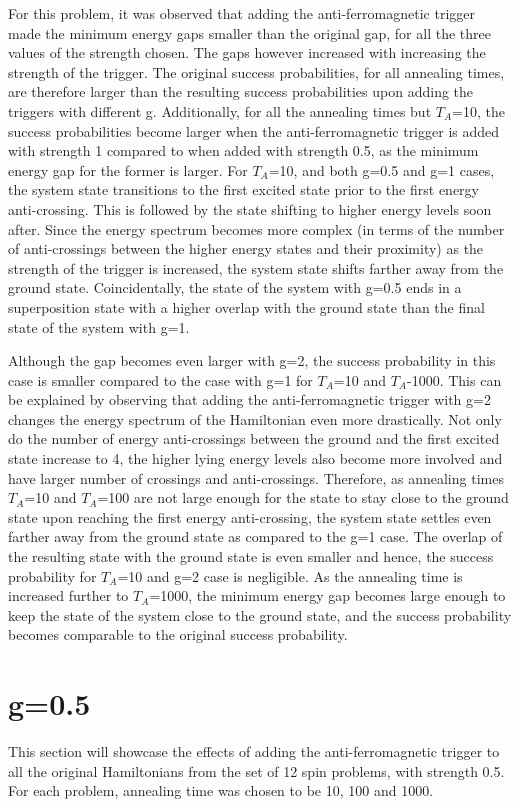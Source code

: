 \documentclass[../main.tex]{subfiles}
\begin{document}
For this problem, it was observed that adding the anti-ferromagnetic trigger made the minimum energy gaps smaller than the original gap, for all the three values of the strength chosen. The gaps however increased with increasing the strength of the trigger. The original success probabilities, for all annealing times, are therefore larger than the resulting success probabilities upon adding the triggers with different g. Additionally, for all the annealing times but $T_A$=10, the success probabilities become larger when the anti-ferromagnetic trigger is added with strength 1 compared to when added with strength 0.5, as the minimum energy gap for the former is larger. For $T_A$=10, and both g=0.5 and g=1 cases, the system state transitions to the first excited state prior to the first energy anti-crossing. This is followed by the state shifting to higher energy levels soon after. Since the energy spectrum becomes more complex (in terms of the number of anti-crossings between the higher energy states and their proximity) as the strength of the trigger is increased, the system state shifts farther away from the ground state. Coincidentally, the state of the system with g=0.5 ends in a superposition state with a higher overlap with the ground state than the final state of the system with g=1.

 Although the gap becomes even larger with g=2, the success probability in this case is smaller compared to the case with g=1 for $T_A$=10 and $T_A$-1000. This can be explained by observing that adding the anti-ferromagnetic trigger with g=2 changes the energy spectrum of the Hamiltonian even more drastically. Not only do the number of energy anti-crossings between the ground and the first excited state increase to 4, the higher lying energy levels also become more involved and have larger number of crossings and anti-crossings. Therefore, as annealing times $T_A$=10 and $T_A$=100 are not large enough for the state to stay close to the ground state upon reaching the first energy anti-crossing, the system state settles even farther away from the ground state as compared to the g=1 case. The overlap of the  resulting state with the ground state is even smaller and hence, the success probability for $T_A$=10 and g=2 case is negligible. As the annealing time is increased further to $T_A$=1000, the minimum energy gap becomes large enough to keep the state of the system close to the ground state, and the success probability becomes comparable to the original success probability.
 
 
\section*{g=0.5}
This section will showcase the effects of adding the anti-ferromagnetic trigger to  all the original Hamiltonians from the set of 12 spin problems, with strength 0.5. For each problem, annealing time was chosen to be 10, 100 and 1000. 
\end{document}
